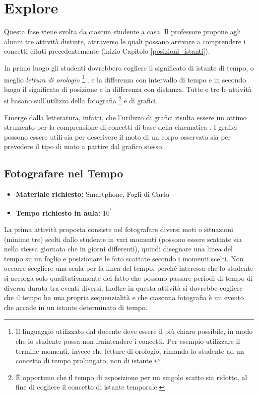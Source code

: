 \documentclass{report} \usepackage[T1]{fontenc} \usepackage[italian]{babel}
\begin{document}
\section{Explore}
Questa fase viene svolta da ciascun studente a casa. Il professore propone agli
alunni tre attività distinte, attraverso le quali possano arrivare a
comprendere i concetti citati precedentemente (inizio Capitolo \ref{posizioni_istanti}).

In primo luogo gli
studenti dovrebbero cogliere il significato di istante di tempo, o meglio
\emph{lettura di orologio}\cite{arons1997teaching}
\footnote{
           Il linguaggio utilizzato dal docente deve essere il più chiaro possibile, in modo
           che lo studente possa non fraintendere i concetti. Per esempio utilizzare il
           termine momenti, invece che letture di orologio, rimanda lo studente ad un
           concetto di tempo prolungato, non di istante.
         }
, e la differenza con intervallo
di tempo e in secondo luogo il significato di posizione e la differenza con distanza.
Tutte e tre le attività si basano sull’utilizzo della fotografia
\footnote{
          \`E opportuno che il tempo di esposizione per un singolo scatto sia ridotto, al
            fine di cogliere il concetto di istante temporale.
         }
e di grafici.

Emerge dalla letteratura, infatti, che l’utilizzo di grafici risulta essere un
ottimo strumento per la comprensione di concetti di base della cinematica
\cite{beichner1994testing}. I grafici possono essere
utili sia per descrivere il moto di un corpo osservato sia per prevedere il tipo
di moto a partire dal grafico stesso.

\subsection{Fotografare nel Tempo}

\begin{itemize}
\item \textbf{Materiale richiesto:} Smartphone, Fogli di Carta
\item \textbf{Tempo richiesto in aula:} 10\textsuperscript{$\prime$}
\end{itemize}

La prima attività proposta consiste nel fotografare diversi moti o situazioni
(minimo tre) scelti dallo studente in vari momenti (possono essere scattate sia
nella stessa giornata che in giorni differenti), quindi disegnare una linea del
tempo su un foglio e posizionare le foto scattate secondo i momenti scelti. Non
occorre scegliere una scala per la linea del tempo, perché interessa che lo
studente si accorga solo qualitativamente del fatto che possano passare periodi
di tempo di diversa durata tra eventi diversi. Inoltre in questa attività si
dovrebbe cogliere che il tempo ha una propria sequenzialità e che ciascuna
fotografia è un evento che accade in un istante determinato di tempo.
\end{document}
